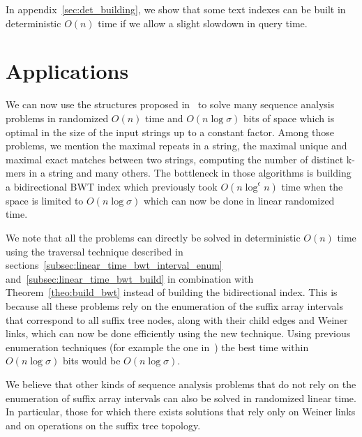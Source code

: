 \documentclass[a4paper]{article}
\begin{document}
In appendix~\ref{sec:det_building}, we show that some text indexes can be built in deterministic $O(n)$ time if we allow a slight slowdown in query time. 

\section{Applications}
\label{sec:applications}
We can now use the structures proposed in~\cite{BCKM13}  
to solve many sequence analysis problems in randomized $O(n)$ time
and $O(n\log\sigma)$ bits of space which is optimal in the size of the input 
strings up to a constant factor. 
Among those problems, we mention the maximal repeats in a string, the maximal unique 
and maximal exact matches between two strings, computing the number of distinct k-mers in 
a string and many others. 
The bottleneck in those algorithms is building a bidirectional 
BWT index which previously took $O(n\log^\epsilon n)$ time when the space is limited  
to $O(n\log\sigma)$ which can now be done in linear randomized time. 


We note that all the problems can directly be solved in deterministic $O(n)$ time using the traversal 
technique described in sections~\ref{subsec:linear_time_bwt_interval_enum} and~\ref{subsec:linear_time_bwt_build} 
in combination with Theorem~\ref{theo:build_bwt} instead of building the bidirectional index. 
This is because all these problems rely on the enumeration of the suffix array intervals 
that correspond to all suffix tree nodes, along with their child edges and Weiner links, 
which can now be done efficiently using the new technique. 
Using previous enumeration techniques (for example the one in~\cite{SOG12})
the best time within $O(n\log\sigma)$ bits would be $O(n\log\sigma)$. 

We believe that other kinds of sequence analysis problems 
that do not rely on the enumeration of suffix array intervals 
can also be solved in randomized linear time. In particular, those 
for which there exists solutions that rely only on Weiner links and 
on operations on the suffix tree topology. 


\begin{comment}
All that is needed is to build the $\mathtt{bwt}$ using theorem~\ref{theo:build_bwt} 
and then use lemma~\ref{lemma:enum_intervals} to traverse the $\mathtt{bwt}$ intervals. 
\end{comment}

\begin{comment}
We also believe that many other problems can now be solved in linear randomized 
time and $O(n\log\sigma)$ bits of space. Among the important ones, we cite the matching statistics between two strings 
and the lempel-ziv factorization problem. 
\end{comment}
\end{document}
